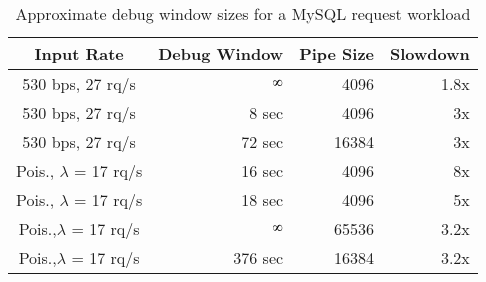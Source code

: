 \begin{table}[ht]
	\centering
	\setlength{\tabcolsep}{2pt}
	\begin{tabular}{c r r r }
		\toprule
		{\bf Input Rate} & \textbf{Debug Window} & \textbf{Pipe Size} & \textbf{Slowdown} \\ \midrule
		530 bps, 27 rq/s                                            & $\infinity$                                                                                     & 4096                                                                            & 1.8x                                                                             \\ %
		530 bps, 27 rq/s                                            & 8 sec                                                                              & 4096                                                                            & 3x                                                                               \\ %
		530 bps, 27 rq/s                                            & 72 sec                                                                             & 16384                                                                           & 3x                                                                               \\ %
		Pois., $\lambda$ = 17 rq/s                                        & 16 sec                                                                             & 4096                                                                            & 8x                                                                               \\ %
		Pois.,		$\lambda$ = 17 rq/s                                        & 18 sec                                                                             & 4096                                                                            & 5x                                                                               \\ %
		Pois.,$\lambda$ = 17 rq/s                                        & $\infinity$                                                                                     & 65536                                                                           & 3.2x                                                                             \\ %
		Pois.,$\lambda$ = 17 rq/s                                        & 376 sec                                                                            & 16384                                                                           & 3.2x                                                                             \\ %
		\bottomrule
	\end{tabular}
	\caption{Approximate debug window sizes for a MySQL request workload}
	\label{table:timewindow}
\end{table}

